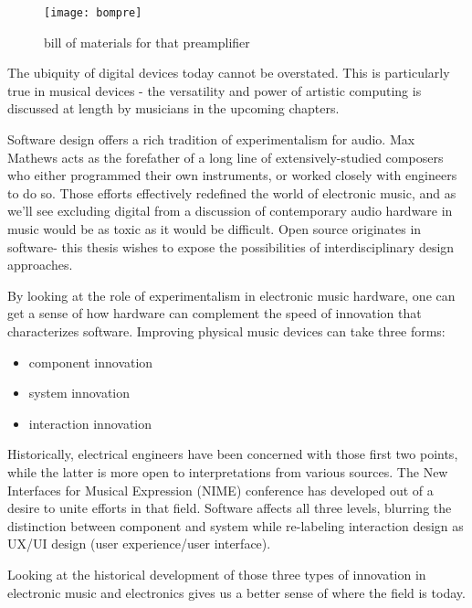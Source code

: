 \begin{figure}[h!]
  \caption{bill of materials for that preamplifier}
  \centering
    \texttt{[image: bompre]}
\end{figure}

The ubiquity of digital devices today cannot be overstated. This is particularly true in musical devices - the versatility and power of artistic computing is discussed at length by musicians in the upcoming chapters. 

Software design offers a rich tradition of experimentalism for audio. Max Mathews acts as the forefather of a long line of extensively-studied composers who either programmed their own instruments, or worked closely with engineers to do so. Those efforts effectively redefined the world of electronic music, and as we'll see excluding digital from a discussion of contemporary audio hardware in music would be as toxic as it would be difficult. Open source originates in software- this thesis wishes to expose the possibilities of interdisciplinary design approaches. 

	By looking at the role of experimentalism in electronic music hardware, one can get a sense of how hardware can complement the speed of innovation that characterizes software. Improving physical music devices can take three forms:  
	
\begin{itemize}
	
\item component innovation

\item system innovation 

\item interaction innovation  

\end{itemize}

Historically, electrical engineers have been concerned with those first two points, while the latter is more open to interpretations from various sources. The New Interfaces for Musical Expression (NIME) conference has developed out of a desire to unite efforts in that field. Software affects all three levels, blurring the distinction between component and system while re-labeling interaction design as UX/UI design (user experience/user interface). 

Looking at the historical development of those three types of innovation in electronic music and electronics gives us a better sense of where the field is today. 

